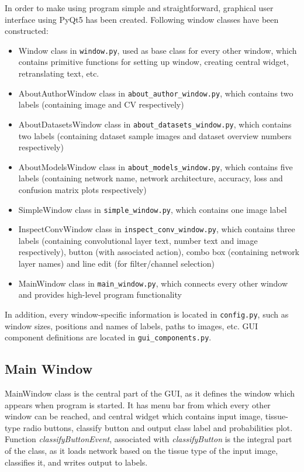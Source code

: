 In order to make using program simple and straightforward, graphical user interface using PyQt5 has been created. Following window classes have been constructed:
\begin{itemize}
	\itemsep 0em
	\item Window class in \texttt{window.py}, used as base class for every other window, which contains primitive functions for setting up window, creating central widget, retranslating text, etc.
	\item AboutAuthorWindow class in \texttt{about\_author\_window.py}, which contains two labels (containing image and CV respectively)
	\item AboutDatasetsWindow class in \texttt{about\_datasets\_window.py}, which contains two labels (containing dataset sample images and dataset overview numbers respectively)
	\item AboutModelsWindow class in \texttt{about\_models\_window.py}, which contains five labels (containing network name, network architecture, accuracy, loss and confusion matrix plots respectively)
	\item SimpleWindow class in \texttt{simple\_window.py}, which contains one image label
	\item InspectConvWindow class in \texttt{inspect\_conv\_window.py}, which contains three labels (containing convolutional layer text, number text and image respectively), button (with associated action), combo box (containing network layer names)  and line edit (for filter/channel selection)
	\item MainWindow class in \texttt{main\_window.py}, which connects every other window and provides high-level program functionality 
\end{itemize}
In addition, every window-specific information is located in \texttt{config.py}, such as window sizes, positions and names of labels, paths to images, etc. GUI component definitions are located in \texttt{gui\_components.py}.

\subsection{Main Window}

MainWindow class is the central part of the GUI, as it defines the window which appears when program is started. It has menu bar from which every other window can be reached, and central widget which contains input image, tissue-type radio buttons, classify button and output class label and probabilities plot. Function \emph{classifyButtonEvent}, associated with \emph{classifyButton} is the integral part of the class, as it loads network based on the tissue type of the input image, classifies it, and writes output to labels.


